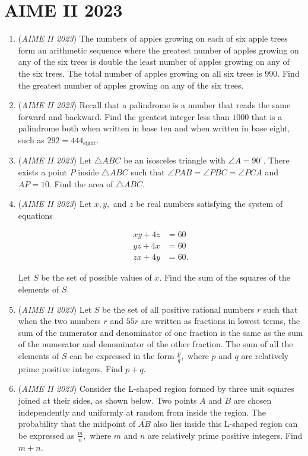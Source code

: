 \section{AIME II 2023}
        \begin{enumerate}
        	\item (\textit{AIME II 2023}) The numbers of apples growing on each of six apple trees form an arithmetic sequence where the greatest number of apples growing on any of the six trees is double the least number of apples growing on any of the six trees. The total number of apples growing on all six trees is $990.$ Find the greatest number of apples growing on any of the six trees.


 

	\item (\textit{AIME II 2023}) Recall that a palindrome is a number that reads the same forward and backward. Find the greatest integer less than $1000$ that is a palindrome both when written in base ten and when written in base eight, such as $292 = 444_{\text{eight}}.$


	\item (\textit{AIME II 2023}) Let $\triangle ABC$ be an isosceles triangle with $\angle A = 90^\circ.$ There exists a point $P$ inside $\triangle ABC$ such that $\angle PAB = \angle PBC = \angle PCA$ and $AP = 10.$ Find the area of $\triangle ABC.$


	\item (\textit{AIME II 2023}) Let $x,y,$ and $z$ be real numbers satisfying the system of equations

 \begin{align*} xy + 4z &= 60 \\ yz + 4x &= 60 \\ zx + 4y &= 60. \end{align*}

Let $S$ be the set of possible values of $x.$ Find the sum of the squares of the elements of $S.$


	\item (\textit{AIME II 2023}) Let $S$ be the set of all positive rational numbers $r$ such that when the two numbers $r$ and $55r$ are written as fractions in lowest terms, the sum of the numerator and denominator of one fraction is the same as the sum of the numerator and denominator of the other fraction. The sum of all the elements of $S$ can be expressed in the form $\frac{p}{q},$ where $p$ and $q$ are relatively prime positive integers. Find $p+q.$


	\item (\textit{AIME II 2023}) Consider the L-shaped region formed by three unit squares joined at their sides, as shown below. Two points $A$ and $B$ are chosen independently and uniformly at random from inside the region. The probability that the midpoint of $\overline{AB}$ also lies inside this L-shaped region can be expressed as $\frac{m}{n},$ where $m$ and $n$ are relatively prime positive integers. Find $m+n.$


\end{enumerate}
